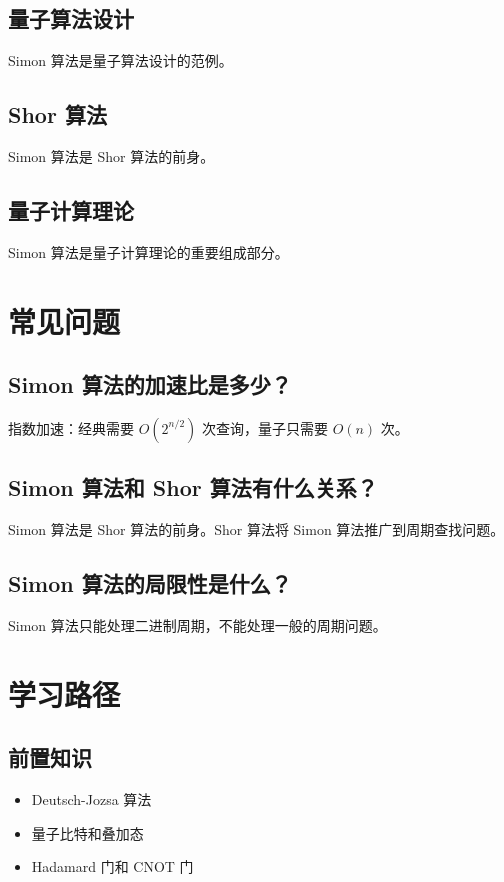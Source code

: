 \documentclass[12pt,a4paper]{article}
\begin{document}
\subsection{量子算法设计}

Simon 算法是量子算法设计的范例。

\subsection{Shor 算法}

Simon 算法是 Shor 算法的前身。

\subsection{量子计算理论}

Simon 算法是量子计算理论的重要组成部分。

\section{常见问题}

\subsection{Simon 算法的加速比是多少？}

指数加速：经典需要 $O(2^{n/2})$ 次查询，量子只需要 $O(n)$ 次。

\subsection{Simon 算法和 Shor 算法有什么关系？}

Simon 算法是 Shor 算法的前身。Shor 算法将 Simon 算法推广到周期查找问题。

\subsection{Simon 算法的局限性是什么？}

Simon 算法只能处理二进制周期，不能处理一般的周期问题。

\section{学习路径}

\subsection{前置知识}
\begin{itemize}
  \item Deutsch-Jozsa 算法
  \item 量子比特和叠加态
  \item Hadamard 门和 CNOT 门
\end{itemize}
\end{document}
